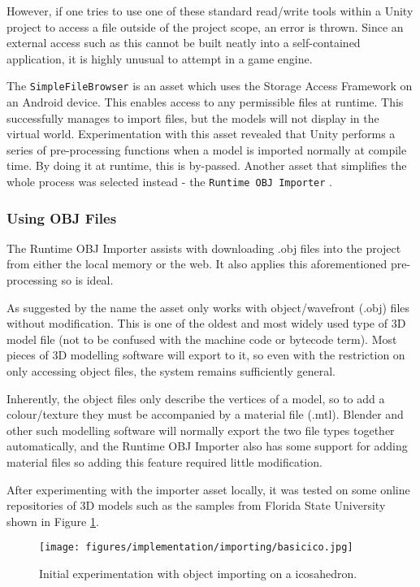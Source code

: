 \documentclass[12pt, a4paper]{article}
\begin{document}
However, if one tries to use one of these standard read/write tools within a Unity project to access a file outside of the project scope, an error is thrown. Since an external access such as this cannot be built neatly into a self-contained application, it is highly unusual to attempt in a game engine.

The \verb|SimpleFileBrowser| is an asset which uses the Storage Access Framework on an Android device. This enables access to any permissible files at runtime. This successfully manages to import files, but the models will not display in the virtual world. Experimentation with this asset revealed that Unity performs a series of pre-processing functions when a model is imported normally at compile time. By doing it at runtime, this is by-passed. Another asset that simplifies the whole process was selected instead - the \verb|Runtime OBJ Importer| \cite{models:objimporter}.

\subsubsection{Using OBJ Files}
The Runtime OBJ Importer assists with downloading .obj files into the project from either the local memory or the web. It also applies this aforementioned pre-processing so is ideal. 

As suggested by the name the asset only works with object/wavefront (.obj) files without modification. This is one of the oldest and most widely used type of 3D model file (not to be confused with the machine code or bytecode term). Most pieces of 3D modelling software will export to it, so even with the restriction on only accessing object files, the system remains sufficiently general.

Inherently, the object files only describe the vertices of a model, so to add a colour/texture they must be accompanied by a material file (.mtl). Blender and other such modelling software will normally export the two file types together automatically, and the Runtime OBJ Importer also has some support for adding material files so adding this feature required little modification.

After experimenting with the importer asset locally, it was tested on some online repositories of 3D models such as the samples from Florida State University \cite{models:samplemodels} shown in Figure \ref{fig:basicico}.

\begin{figure}[h]
    \centering
    \texttt{[image: figures/implementation/importing/basicico.jpg]}
        \caption{Initial experimentation with object importing on a icosahedron.}
        \label{fig:basicico}
\end{figure}
\end{document}
